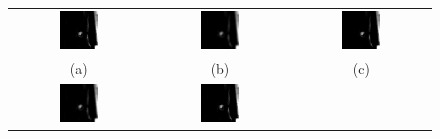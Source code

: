 {\begin{figure}[htbp]
	\centering
	\begin{tabular}{ccc}
			\includegraphics[width=0.3\textwidth]{bab3/reduksi_noise/img_360_ori.png} &
			\includegraphics[width=0.3\textwidth]{bab3/reduksi_noise/img_360_gaussian.png} &
			\includegraphics[width=0.3\textwidth]{bab3/reduksi_noise/img_360_median.png} \\
			(a)  & (b)  & (c)  \\ %
			\includegraphics[width=0.3\textwidth]{bab3/reduksi_noise/img_360_mean.png} &
			\includegraphics[width=0.3\textwidth]{bab3/reduksi_noise/img_360_bilateral.png} &

\end{tabular}
\end{figure}}
